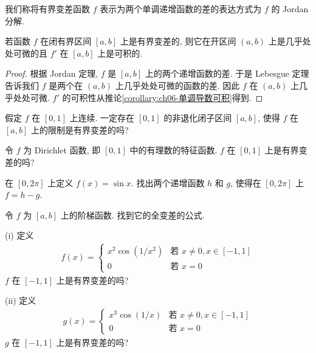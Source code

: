 \documentclass[../../main.tex]{subfiles}
\begin{document}
我们称将有界变差函数 $f$ 表示为两个单调递增函数的差的表达方式为 $f$ 的 Jordan 分解.

\begin{corollary}\label{corollary:ch06-BV可微}
若函数 $f$ 在闭有界区间 $[a,b]$ 上是有界变差的, 则它在开区间 $(a,b)$ 上是几乎处处可微的且 $f'$ 在 $[a,b]$ 上是可积的.
\end{corollary}

\begin{proof}
根据 Jordan 定理, $f$ 是 $[a,b]$ 上的两个递增函数的差. 于是 Lebesgue 定理告诉我们 $f$ 是两个在 $(a,b)$ 上几乎处处可微的函数的差. 因此 $f$ 在 $(a,b)$ 上几乎处处可微. $f'$ 的可积性从推论\cref{corollary:ch06-单调导数可积}得到.
\end{proof}

\begin{exercise}\label{exercise:ch06-25}
假定 $f$ 在 $[0,1]$ 上连续. 一定存在 $[0,1]$ 的非退化闭子区间 $[a,b]$, 使得 $f$ 在 $[a,b]$ 上的限制是有界变差的吗?
\end{exercise}

\begin{exercise}\label{exercise:ch06-26}
令 $f$ 为 Dirichlet 函数, 即 $[0,1]$ 中的有理数的特征函数. $f$ 在 $[0,1]$ 上是有界变差的吗?
\end{exercise}

\begin{exercise}\label{exercise:ch06-27}
在 $[0,2\pi]$ 上定义 $f(x)=\sin x$. 找出两个递增函数 $h$ 和 $g$, 使得在 $[0,2\pi]$ 上 $f=h-g$.
\end{exercise}

\begin{exercise}\label{exercise:ch06-28}
令 $f$ 为 $[a,b]$ 上的阶梯函数. 找到它的全变差的公式.
\end{exercise}

\begin{exercise}\label{exercise:ch06-29}
(i) 定义
\begin{align*}
f(x)=
\begin{cases}
x^{2}\cos(1/x^{2})&\text{若 }x\neq 0,x\in[-1,1]\\
0&\text{若 }x=0
\end{cases}
\end{align*}
$f$ 在 $[-1,1]$ 上是有界变差的吗?

(ii) 定义
\begin{align*}
g(x)=
\begin{cases}
x^{3}\cos(1/x)&\text{若 }x\neq 0,x\in[-1,1]\\
0&\text{若 }x=0
\end{cases}
\end{align*}
$g$ 在 $[-1,1]$ 上是有界变差的吗?
\end{exercise}
\end{document}

